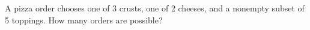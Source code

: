 A pizza order chooses one of 3 crusts, one of 2 cheeses, and a nonempty subset of 5 toppings. How many orders are possible?
